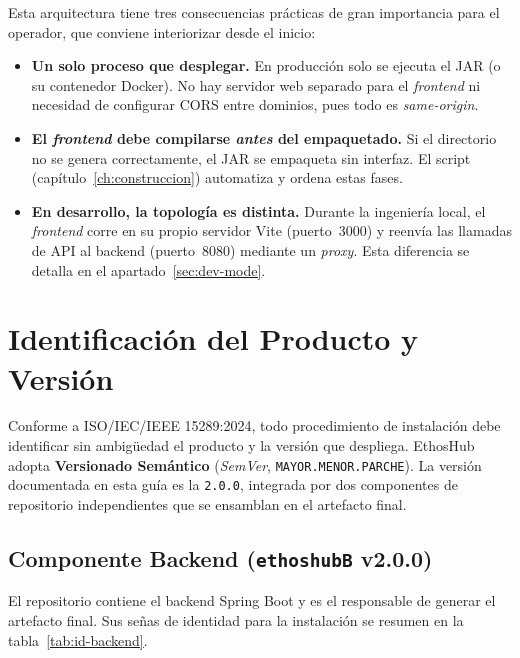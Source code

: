 Esta arquitectura tiene tres consecuencias prácticas de gran importancia para el
operador, que conviene interiorizar desde el inicio:\par

\begin{itemize}[noitemsep]
    \item \textbf{Un solo proceso que desplegar.} En producción solo se ejecuta el JAR
    (o su contenedor Docker). No hay servidor web separado para el \textit{frontend} ni
    necesidad de configurar CORS entre dominios, pues todo es \textit{same-origin}.
    \item \textbf{El \textit{frontend} debe compilarse \textit{antes} del empaquetado.}
    Si el directorio  no se genera correctamente, el JAR se empaqueta sin
    interfaz. El script  (capítulo~\ref{ch:construccion}) automatiza y
    ordena estas fases.
    \item \textbf{En desarrollo, la topología es distinta.} Durante la ingeniería local,
    el \textit{frontend} corre en su propio servidor Vite (puerto~3000) y reenvía las
    llamadas de API al backend (puerto~8080) mediante un \textit{proxy}. Esta diferencia
    se detalla en el apartado~\ref{sec:dev-mode}.
\end{itemize}

\section{Identificación del Producto y Versión}%
\label{sec:identificacion}

Conforme a ISO/IEC/IEEE 15289:2024, todo procedimiento de instalación debe identificar
sin ambigüedad el producto y la versión que despliega. EthosHub adopta
\textbf{Versionado Semántico} (\textit{SemVer}, \texttt{MAYOR.MENOR.PARCHE}). La versión
documentada en esta guía es la \texttt{2.0.0}, integrada por dos componentes de
repositorio independientes que se ensamblan en el artefacto final.\par

\subsection{Componente Backend (\texttt{ethoshubB} v2.0.0)}%
\label{subsec:backend-id}

El repositorio  contiene el backend Spring Boot y es el responsable
de generar el artefacto final. Sus señas de identidad para la instalación se resumen en
la tabla~\ref{tab:id-backend}.\par

